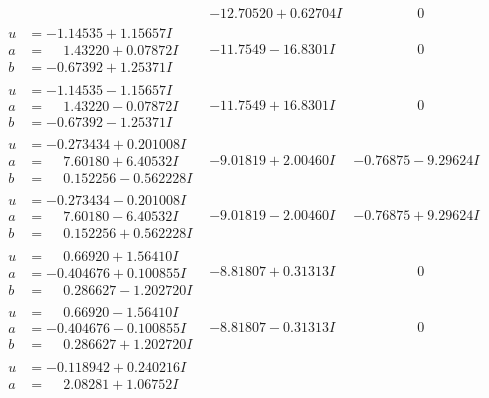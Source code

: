 \documentclass[1p]{elsarticle_modified}
\theoremstyle{definition}
\begin{document}
$$\begin{array}{c|c|c}
 & -12.70520 + 0.62704 I & \phantom{-0.000000 } 0 \\ \hline\begin{aligned}
u &= -1.14535 + 1.15657 I \\
a &= \phantom{-}1.43220 + 0.07872 I \\
b &= -0.67392 + 1.25371 I\end{aligned}
 & -11.7549 - 16.8301 I & \phantom{-0.000000 } 0 \\ \hline\begin{aligned}
u &= -1.14535 - 1.15657 I \\
a &= \phantom{-}1.43220 - 0.07872 I \\
b &= -0.67392 - 1.25371 I\end{aligned}
 & -11.7549 + 16.8301 I & \phantom{-0.000000 } 0 \\ \hline\begin{aligned}
u &= -0.273434 + 0.201008 I \\
a &= \phantom{-}7.60180 + 6.40532 I \\
b &= \phantom{-}0.152256 - 0.562228 I\end{aligned}
 & -9.01819 + 2.00460 I & -0.76875 - 9.29624 I \\ \hline\begin{aligned}
u &= -0.273434 - 0.201008 I \\
a &= \phantom{-}7.60180 - 6.40532 I \\
b &= \phantom{-}0.152256 + 0.562228 I\end{aligned}
 & -9.01819 - 2.00460 I & -0.76875 + 9.29624 I \\ \hline\begin{aligned}
u &= \phantom{-}0.66920 + 1.56410 I \\
a &= -0.404676 + 0.100855 I \\
b &= \phantom{-}0.286627 - 1.202720 I\end{aligned}
 & -8.81807 + 0.31313 I & \phantom{-0.000000 } 0 \\ \hline\begin{aligned}
u &= \phantom{-}0.66920 - 1.56410 I \\
a &= -0.404676 - 0.100855 I \\
b &= \phantom{-}0.286627 + 1.202720 I\end{aligned}
 & -8.81807 - 0.31313 I & \phantom{-0.000000 } 0 \\ \hline\begin{aligned}
u &= -0.118942 + 0.240216 I \\
a &= \phantom{-}2.08281 + 1.06752 I \\

\end{aligned}
\end{array}$$
\end{document}

